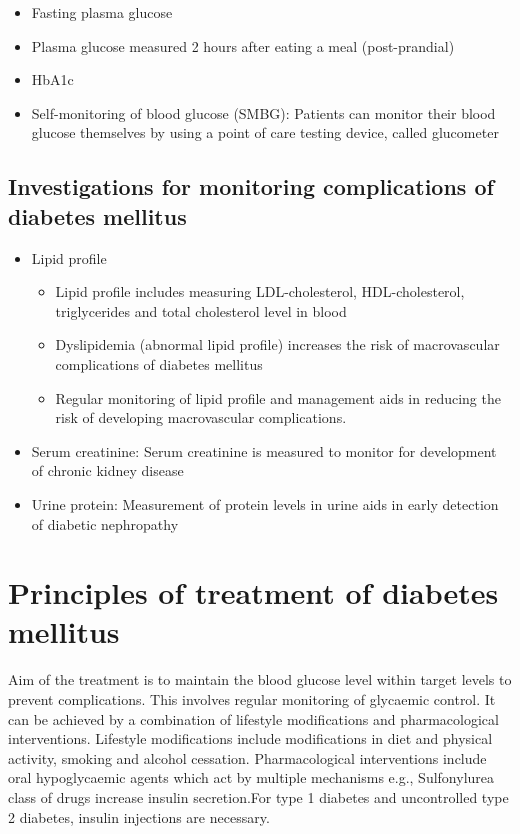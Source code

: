 \documentclass[
]{book}
\begin{document}
\begin{itemize}
\item
  Fasting plasma glucose
\item
  Plasma glucose measured 2 hours after eating a meal (post-prandial)
\item
  HbA1c
\item
  Self-monitoring of blood glucose (SMBG): Patients can monitor their blood glucose themselves by using a point of care testing device, called glucometer
\end{itemize}

\subsection{Investigations for monitoring complications of diabetes mellitus}\label{investigations-for-monitoring-complications-of-diabetes-mellitus}

\begin{itemize}
\item
  Lipid profile

  \begin{itemize}
  \item
    Lipid profile includes measuring LDL-cholesterol, HDL-cholesterol, triglycerides and total cholesterol level in blood
  \item
    Dyslipidemia (abnormal lipid profile) increases the risk of macrovascular complications of diabetes mellitus
  \item
    Regular monitoring of lipid profile and management aids in reducing the risk of developing macrovascular complications.
  \end{itemize}
\item
  Serum creatinine: Serum creatinine is measured to monitor for development of chronic kidney disease
\item
  Urine protein: Measurement of protein levels in urine aids in early detection of diabetic nephropathy
\end{itemize}

\section{Principles of treatment of diabetes mellitus}\label{principles-of-treatment-of-diabetes-mellitus}

Aim of the treatment is to maintain the blood glucose level within target levels to prevent complications. This involves regular monitoring of glycaemic control. It can be achieved by a combination of lifestyle modifications and pharmacological interventions. Lifestyle modifications include modifications in diet and physical activity, smoking and alcohol cessation. Pharmacological interventions include oral hypoglycaemic agents which act by multiple mechanisms e.g., Sulfonylurea class of drugs increase insulin secretion.For type 1 diabetes and uncontrolled type 2 diabetes, insulin injections are necessary.
\end{document}
